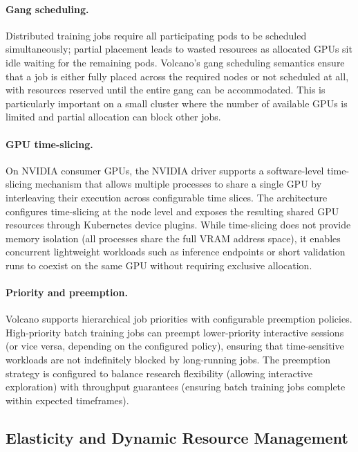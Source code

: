 \paragraph{Gang scheduling.} Distributed training jobs require all participating pods to be scheduled simultaneously; partial placement leads to wasted resources as allocated GPUs sit idle waiting for the remaining pods. Volcano's gang scheduling semantics ensure that a job is either fully placed across the required nodes or not scheduled at all, with resources reserved until the entire gang can be accommodated. This is particularly important on a small cluster where the number of available GPUs is limited and partial allocation can block other jobs.

\paragraph{GPU time-slicing.} On NVIDIA consumer GPUs, the NVIDIA driver supports a software-level time-slicing mechanism that allows multiple processes to share a single GPU by interleaving their execution across configurable time slices. The architecture configures time-slicing at the node level and exposes the resulting shared GPU resources through Kubernetes device plugins. While time-slicing does not provide memory isolation (all processes share the full VRAM address space), it enables concurrent lightweight workloads such as inference endpoints or short validation runs to coexist on the same GPU without requiring exclusive allocation.

\paragraph{Priority and preemption.} Volcano supports hierarchical job priorities with configurable preemption policies. High-priority batch training jobs can preempt lower-priority interactive sessions (or vice versa, depending on the configured policy), ensuring that time-sensitive workloads are not indefinitely blocked by long-running jobs. The preemption strategy is configured to balance research flexibility (allowing interactive exploration) with throughput guarantees (ensuring batch training jobs complete within expected timeframes).

\subsection{Elasticity and Dynamic Resource Management}

